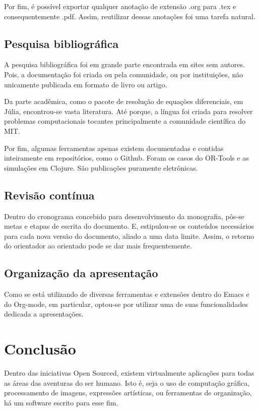 \documentclass[
12pt,				%
openright,			%
oneside,			%
a4paper,			%
english,			%
french,				%
spanish,			%
brazil,				%
]{abntex2}
\begin{document}
Por fim, é possível exportar qualquer anotação de extensão .org para
.tex e consequentemente .pdf. Assim, reutilizar dessas anotações foi
uma tarefa natural.

\section{Pesquisa bibliográfica}
A pesquisa bibliográfica foi em grande parte encontrada em sites sem
autores. Pois, a documentação foi criada ou pela comunidade, ou por
instituições, não unicamente publicada em formato de livro ou artigo.

Da parte acadêmica, como o pacote de resolução de equações
diferenciais, em Júlia, encontrou-se vasta literatura. Até porque, a
língua foi criada para resolver problemas computacionais tocantes
principalmente a comunidade científica do MIT.

Por fim, algumas ferramentas apenas existem documentadas e contidas
inteiramente em repositórios, como o Github. Foram os casos do
OR-Tools e as simulações em Clojure. São publicações puramente eletrônicas.

\section{Revisão contínua}

Dentro do cronograma concebido para desenvolvimento da monografia,
pôs-se metas e etapas de escrita do documento. E, estipulou-se os
conteúdos necessários para cada nova versão do documento, aliado a uma
data limite. Assim, o retorno do orientador ao orientado pode se dar
mais frequentemente.

\section{Organização da apresentação}

Como se está utilizando de diversas ferramentas e extensões dentro do
Emacs e do Org-mode, em particular, optou-se por utilizar uma de suas
funcionalidades dedicada a apresentações. 

\chapter{Conclusão}

Dentro das iniciativas Open Sourced, existem virtualmente aplicações
para todas as áreas das aventuras do ser humano. Isto é, seja o uso de
computação gráfica, processamento de imagens, expressões artísticas,
ou ferramentas de organização, há um software escrito para esse fim.
\end{document}
